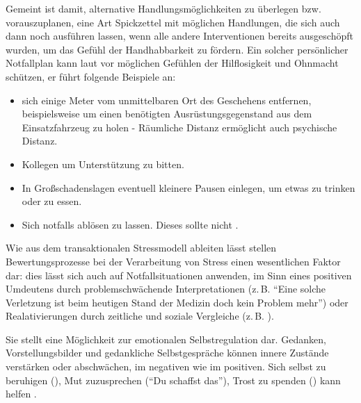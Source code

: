 {Gemeint ist damit, alternative Handlungsmöglichkeiten zu
überlegen bzw. vorauszuplanen, eine Art Spickzettel mit
möglichen Handlungen, die sich auch dann noch ausführen
lassen, wenn alle andere Interventionen bereits ausgeschöpft
wurden, um das Gefühl der Handhabbarkeit zu fördern. Ein
solcher persönlicher Notfallplan kann laut 
\cite{Karutz200912} vor möglichen Gefühlen der Hilflosigkeit und Ohnmacht schützen,
er führt folgende Beispiele an:
\begin{itemize}
  \item sich einige Meter vom unmittelbaren Ort des Geschehens entfernen, beispielsweise um einen benötigten Ausrüstungsgegenstand aus dem Einsatzfahrzeug zu holen - Räumliche Distanz ermöglicht auch psychische Distanz.
  \item Kollegen um Unterstützung zu bitten.
  \item In Großschadenslagen eventuell kleinere Pausen
  einlegen, um etwas zu trinken oder zu essen.
  \item Sich notfalls ablösen zu lassen.  Dieses sollte nicht
  .
\end{itemize}}
{}
{}
{}
{}




{Wie aus dem transaktionalen
Stressmodell ableiten lässt stellen Bewertungsprozesse bei
der Verarbeitung von Stress einen wesentlichen Faktor dar:
dies lässt sich auch auf Notfallsituationen anwenden, im
Sinn eines positiven Umdeutens \cite{BengelPsyNotfallmedRd2-PsyBelRdPers}  durch
problemschwächende Interpretationen (z.\,B. \enquote{Eine solche
Verletzung ist beim heutigen Stand der Medizin doch kein
Problem mehr}) oder Realativierungen durch zeitliche und
soziale Vergleiche (z.\,B. ).}
{}
{}
{}
{}

{ Sie stellt eine Möglichkeit
zur emotionalen Selbstregulation dar. Gedanken,
Vorstellungsbilder und gedankliche Selbstgespräche können
innere Zustände verstärken oder abschwächen, im negativen
wie im positiven. Sich selbst zu beruhigen (), Mut zuzusprechen (\enquote{Du schaffst
das}), Trost zu spenden () kann helfen 
\cite{BengelPsyNotfallmedRd2-PsyBelRdPers}.}
{}
{}
{}
{}


